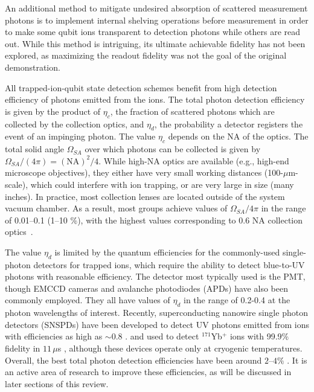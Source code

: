 \documentclass[%
reprint,
 amsmath,amssymb,
]{revtex4-1}
\begin{document}
An additional method to mitigate undesired absorption of scattered measurement photons is to implement internal shelving operations before measurement in order to make some qubit ions transparent to detection photons \cite{RoosControl2004} while others are read out. While this method is intriguing, its ultimate achievable fidelity has not been explored, as maximizing the readout fidelity was not the goal of the original demonstration.

All trapped-ion-qubit state detection schemes benefit from high detection efficiency of photons emitted from the ions.  The total photon detection efficiency is given by the product of $\eta_c$, the fraction of scattered photons which are collected by the collection optics, and $\eta_d$, the probability a detector registers the event of an impinging photon. The value $\eta_c$ depends on the NA of the optics.  The total solid angle $\Omega_{SA}$ over which photons can be collected is given by $\Omega_{SA}/(4 \pi) = (\textrm{NA})^2/4$.  While high-NA optics are available (e.g., high-end microscope objectives), they either have very small working distances (100-$\mu$m-scale), which could interfere with ion trapping, or are very large in size (many inches). In practice, most collection lenses are located outside of the system vacuum chamber. As a result, most groups achieve values of $\Omega_{SA}/4\pi$ in the range of 0.01--0.1 (1--10 \%), with the highest values corresponding to 0.6 NA collection optics~\cite{noek2013high}.

The value $\eta_d$ is limited by the quantum efficiencies for the commonly-used single-photon detectors for trapped ions, which require the ability to detect blue-to-UV photons with reasonable efficiency.  The detector most typically used is the PMT, though EMCCD cameras and avalanche photodiodes (APDs) have also been commonly employed.  They all have values of $\eta_d$ in the range of 0.2-0.4 at the photon wavelengths of interest.  Recently, superconducting nanowire single photon detectors (SNSPDs) have been developed to detect UV photons emitted from ions with efficiencies as high as $\sim$0.8 \cite{SlichterSNSPD2017, WollmanSNSPD2017}.  and used to detect $^{171}$Yb$^+$ ions with 99.9\% fidelity in $11 \, \mu$s \cite{CrainSNSPDdetect2019}, although these devices operate only at cryogenic temperatures. Overall, the best total photon detection efficiencies have been around $2$--$4 \%$ \cite{noek2013high,CrainSNSPDdetect2019}.  It is an active area of research to improve these efficiencies, as will be discussed in later sections of this review.
\end{document}
